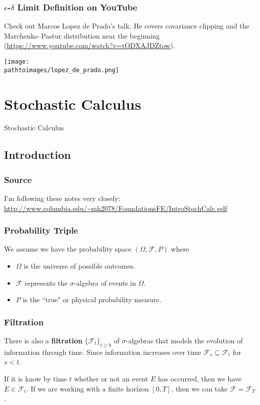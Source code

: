 \documentclass{beamer}
\newcommand{\pathtoimages}{/Users/charlesrambo/Desktop/Bootcamp24/Images}
\begin{document}
\begin{frame}
\frametitle{$\epsilon$-$\delta$ Limit Definition on YouTube}
Check out Marcos Lopez de Prado's talk. He covers covariance clipping and the Marchenko–Pastur distribution near the beginning  {\tiny(\url{https://www.youtube.com/watch?v=tODXAJDZtow})}.
\begin{center}
\texttt{[image: \\pathtoimages/lopez\_de\_prado.png]}
\end{center}
\end{frame}

\section{Stochastic Calculus} 

\begin{frame}
\begin{center}
\Huge Stochastic Calculus
\end{center}
\end{frame}

\subsection{Introduction} 

\begin{frame}
\frametitle{Source} 
I'm following these notes very closely: \url{http://www.columbia.edu/~mh2078/FoundationsFE/IntroStochCalc.pdf}
\end{frame}

\begin{frame}
\frametitle{Probability Triple}
We assume we have the probability space $(\Omega, \mathcal{F}, P)$ where
\begin{itemize}
\item $\Omega$ is the universe of possible outcomes.
\item $\mathcal{F}$ represents the $\sigma$-algebra of events in $\Omega$.
\item $P$ is the ``true" or physical probability measure.
\end{itemize}
\end{frame}

\begin{frame}
\frametitle{Filtration}
There is also a {\bf filtration} $\{\mathcal{F}_t\}_{t\geq 0}$ of $\sigma$-algebras that models the evolution of information through time. Since information increases over time $\mathcal{F}_s \subseteq \mathcal{F}_t$ for $s < t$.

If it is know by time $t$ whether or not an event $E$ has occurred, then we have $E\in\mathcal{F}_t$. If we are working with a finite horizon $[0, T]$, then we can take $\mathcal{F} = \mathcal{F}_T$.
\end{frame}
\end{document}
